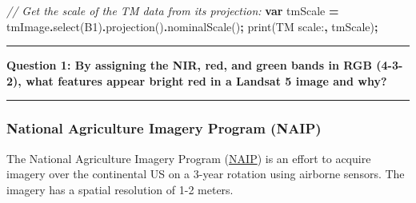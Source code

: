 \documentclass[
]{article}
\newenvironment{Shaded}{\begin{snugshade}}{\end{snugshade}}
\newcommand{\CommentTok}[1]{\textcolor[rgb]{0.56,0.35,0.01}{\textit{#1}}}
\newcommand{\FunctionTok}[1]{\textcolor[rgb]{0.00,0.00,0.00}{#1}}
\newcommand{\KeywordTok}[1]{\textcolor[rgb]{0.13,0.29,0.53}{\textbf{#1}}}
\newcommand{\NormalTok}[1]{#1}
\newcommand{\OperatorTok}[1]{\textcolor[rgb]{0.81,0.36,0.00}{\textbf{#1}}}
\newcommand{\StringTok}[1]{\textcolor[rgb]{0.31,0.60,0.02}{#1}}
\begin{document}
\begin{enumerate}
\begin{Shaded}
\begin{Highlighting}[]
\CommentTok{// Get the scale of the TM data from its projection:}
\KeywordTok{var}\NormalTok{ tmScale }\OperatorTok{=}\NormalTok{ tmImage}\OperatorTok{.}\FunctionTok{select}\NormalTok{(}\StringTok{\textquotesingle{}B1\textquotesingle{}}\NormalTok{)}\OperatorTok{.}\FunctionTok{projection}\NormalTok{()}\OperatorTok{.}\FunctionTok{nominalScale}\NormalTok{()}\OperatorTok{;}
\FunctionTok{print}\NormalTok{(}\StringTok{\textquotesingle{}TM scale:\textquotesingle{}}\OperatorTok{,}\NormalTok{ tmScale)}\OperatorTok{;}
\end{Highlighting}
\end{Shaded}
\end{enumerate}

\begin{center}\rule{0.5\linewidth}{0.5pt}\end{center}

\textbf{Question 1: By assigning the NIR, red, and green bands in RGB (4-3-2), what features appear bright red in a Landsat 5 image and why?}

\begin{center}\rule{0.5\linewidth}{0.5pt}\end{center}

\hypertarget{national-agriculture-imagery-program-naip}{%
\subsubsection{National Agriculture Imagery Program (NAIP)}\label{national-agriculture-imagery-program-naip}}

The National Agriculture Imagery Program (\href{http://www.fsa.usda.gov/programs-and-services/aerial-photography/imagery-programs/naip-imagery/}{NAIP}) is an effort to acquire imagery over the continental US on a 3-year rotation using airborne sensors. The imagery has a spatial resolution of 1-2 meters.
\end{document}
